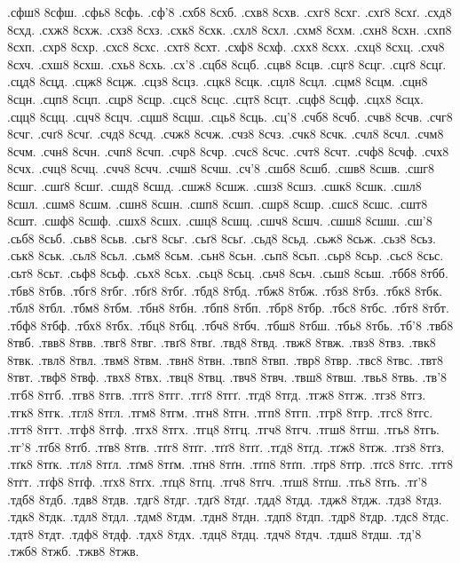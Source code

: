 {.сфш8 8сфш.
.сфь8 8сфь.
.сф'8
.схб8 8схб.
.схв8 8схв.
.схг8 8схг.
.схґ8 8схґ.
.схд8 8схд.
.схж8 8схж.
.схз8 8схз.
.схк8 8схк.
.схл8 8схл.
.схм8 8схм.
.схн8 8схн.
.схп8 8схп.
.схр8 8схр.
.схс8 8схс.
.схт8 8схт.
.схф8 8схф.
.схх8 8схх.
.схц8 8схц.
.схч8 8схч.
.схш8 8схш.
.схь8 8схь.
.сх'8
.сцб8 8сцб.
.сцв8 8сцв.
.сцг8 8сцг.
.сцґ8 8сцґ.
.сцд8 8сцд.
.сцж8 8сцж.
.сцз8 8сцз.
.сцк8 8сцк.
.сцл8 8сцл.
.сцм8 8сцм.
.сцн8 8сцн.
.сцп8 8сцп.
.сцр8 8сцр.
.сцс8 8сцс.
.сцт8 8сцт.
.сцф8 8сцф.
.сцх8 8сцх.
.сцц8 8сцц.
.сцч8 8сцч.
.сцш8 8сцш.
.сць8 8сць.
.сц'8
.счб8 8счб.
.счв8 8счв.
.счг8 8счг.
.счґ8 8счґ.
.счд8 8счд.
.счж8 8счж.
.счз8 8счз.
.счк8 8счк.
.счл8 8счл.
.счм8 8счм.
.счн8 8счн.
.счп8 8счп.
.счр8 8счр.
.счс8 8счс.
.счт8 8счт.
.счф8 8счф.
.счх8 8счх.
.счц8 8счц.
.счч8 8счч.
.счш8 8счш.
.сч'8
.сшб8 8сшб.
.сшв8 8сшв.
.сшг8 8сшг.
.сшґ8 8сшґ.
.сшд8 8сшд.
.сшж8 8сшж.
.сшз8 8сшз.
.сшк8 8сшк.
.сшл8 8сшл.
.сшм8 8сшм.
.сшн8 8сшн.
.сшп8 8сшп.
.сшр8 8сшр.
.сшс8 8сшс.
.сшт8 8сшт.
.сшф8 8сшф.
.сшх8 8сшх.
.сшц8 8сшц.
.сшч8 8сшч.
.сшш8 8сшш.
.сш'8
.сьб8 8сьб.
.сьв8 8сьв.
.сьг8 8сьг.
.сьґ8 8сьґ.
.сьд8 8сьд.
.сьж8 8сьж.
.сьз8 8сьз.
.ськ8 8ськ.
.сьл8 8сьл.
.сьм8 8сьм.
.сьн8 8сьн.
.сьп8 8сьп.
.сьр8 8сьр.
.сьс8 8сьс.
.сьт8 8сьт.
.сьф8 8сьф.
.сьх8 8сьх.
.сьц8 8сьц.
.сьч8 8сьч.
.сьш8 8сьш.
.тбб8 8тбб.
.тбв8 8тбв.
.тбг8 8тбг.
.тбґ8 8тбґ.
.тбд8 8тбд.
.тбж8 8тбж.
.тбз8 8тбз.
.тбк8 8тбк.
.тбл8 8тбл.
.тбм8 8тбм.
.тбн8 8тбн.
.тбп8 8тбп.
.тбр8 8тбр.
.тбс8 8тбс.
.тбт8 8тбт.
.тбф8 8тбф.
.тбх8 8тбх.
.тбц8 8тбц.
.тбч8 8тбч.
.тбш8 8тбш.
.тбь8 8тбь.
.тб'8
.твб8 8твб.
.твв8 8твв.
.твг8 8твг.
.твґ8 8твґ.
.твд8 8твд.
.твж8 8твж.
.твз8 8твз.
.твк8 8твк.
.твл8 8твл.
.твм8 8твм.
.твн8 8твн.
.твп8 8твп.
.твр8 8твр.
.твс8 8твс.
.твт8 8твт.
.твф8 8твф.
.твх8 8твх.
.твц8 8твц.
.твч8 8твч.
.твш8 8твш.
.твь8 8твь.
.тв'8
.тгб8 8тгб.
.тгв8 8тгв.
.тгг8 8тгг.
.тгґ8 8тгґ.
.тгд8 8тгд.
.тгж8 8тгж.
.тгз8 8тгз.
.тгк8 8тгк.
.тгл8 8тгл.
.тгм8 8тгм.
.тгн8 8тгн.
.тгп8 8тгп.
.тгр8 8тгр.
.тгс8 8тгс.
.тгт8 8тгт.
.тгф8 8тгф.
.тгх8 8тгх.
.тгц8 8тгц.
.тгч8 8тгч.
.тгш8 8тгш.
.тгь8 8тгь.
.тг'8
.тґб8 8тґб.
.тґв8 8тґв.
.тґг8 8тґг.
.тґґ8 8тґґ.
.тґд8 8тґд.
.тґж8 8тґж.
.тґз8 8тґз.
.тґк8 8тґк.
.тґл8 8тґл.
.тґм8 8тґм.
.тґн8 8тґн.
.тґп8 8тґп.
.тґр8 8тґр.
.тґс8 8тґс.
.тґт8 8тґт.
.тґф8 8тґф.
.тґх8 8тґх.
.тґц8 8тґц.
.тґч8 8тґч.
.тґш8 8тґш.
.тґь8 8тґь.
.тґ'8
.тдб8 8тдб.
.тдв8 8тдв.
.тдг8 8тдг.
.тдґ8 8тдґ.
.тдд8 8тдд.
.тдж8 8тдж.
.тдз8 8тдз.
.тдк8 8тдк.
.тдл8 8тдл.
.тдм8 8тдм.
.тдн8 8тдн.
.тдп8 8тдп.
.тдр8 8тдр.
.тдс8 8тдс.
.тдт8 8тдт.
.тдф8 8тдф.
.тдх8 8тдх.
.тдц8 8тдц.
.тдч8 8тдч.
.тдш8 8тдш.
.тд'8
.тжб8 8тжб.
.тжв8 8тжв.
}
